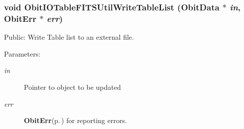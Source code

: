 \subsubsection{\setlength{\rightskip}{0pt plus 5cm}void Obit\-IOTable\-FITSUtil\-Write\-Table\-List ({\bf Obit\-Data} $\ast$ {\em in}, {\bf Obit\-Err} $\ast$ {\em err})}\label{ObitIOTableFITSUtil_8h_a1}


Public: Write Table list to an external file. 

\begin{Desc}
\item[Parameters:]
\begin{description}
\item[{\em in}]Pointer to object to be updated \item[{\em err}]{\bf Obit\-Err}{\rm (p.\,\pageref{structObitErr})} for reporting errors. \end{description}
\end{Desc}
